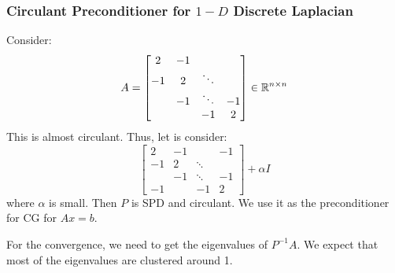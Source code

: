 \documentclass[../main/main.tex]{subfiles}
\begin{document}
\subsubsection{Circulant Preconditioner for $1-D$ Discrete Laplacian}
Consider: \[
A = \begin{bmatrix}
  2&-1&&\\
  -1&2&\ddots&\\
  &-1&\ddots&-1\\
  &&-1&2
\end{bmatrix}
\in \mathbb{R} ^{n \times  n}
\]
This is almost circulant. Thus, let is consider: \[
 \begin{bmatrix}
  2&-1&&-1\\
  -1&2&\ddots&\\
  &-1&\ddots&-1\\
  -1&&-1&2
\end{bmatrix}+\alpha  I
\] where $\alpha $ is small. Then $P$ is SPD and circulant. We use it as the preconditioner for CG for $Ax = b$.

For the convergence, we need to get the eigenvalues of $P^{-1}A$. We expect that most of the eigenvalues are clustered around 1.\\
\end{document}
